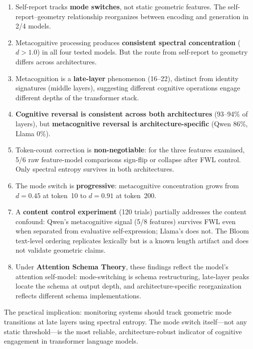 \documentclass[11pt,a4paper]{article}
\begin{document}
\begin{enumerate}
    \item Self-report tracks \textbf{mode switches}, not static geometric features. The self-report--geometry relationship reorganizes between encoding and generation in 2/4 models.

    \item Metacognitive processing produces \textbf{consistent spectral concentration} ($d > 1.0$) in all four tested models. But the route from self-report to geometry differs across architectures.

    \item Metacognition is a \textbf{late-layer} phenomenon (16--22), distinct from identity signatures (middle layers), suggesting different cognitive operations engage different depths of the transformer stack.

    \item \textbf{Cognitive reversal is consistent across both architectures} (93--94\% of layers), but \textbf{metacognitive reversal is architecture-specific} (Qwen 86\%, Llama 0\%).

    \item Token-count correction is \textbf{non-negotiable}: for the three features examined, 5/6 raw feature-model comparisons sign-flip or collapse after FWL control. Only spectral entropy survives in both architectures.

    \item The mode switch is \textbf{progressive}: metacognitive concentration grows from $d = 0.45$ at token~10 to $d = 0.91$ at token~200.

    \item A \textbf{content control experiment} (120 trials) partially addresses the content confound: Qwen's metacognitive signal (5/8 features) survives FWL even when separated from evaluative self-expression; Llama's does not. The Bloom text-level ordering replicates lexically but is a known length artifact and does not validate geometric claims.

    \item Under \textbf{Attention Schema Theory}, these findings reflect the model's attention self-model: mode-switching is schema restructuring, late-layer peaks locate the schema at output depth, and architecture-specific reorganization reflects different schema implementations.
\end{enumerate}

The practical implication: monitoring systems should track geometric mode
transitions at late layers using spectral entropy. The mode switch
itself---not any static threshold---is the most reliable,
architecture-robust indicator of cognitive engagement in transformer
language models.
\end{document}
